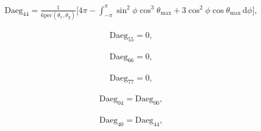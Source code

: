 \documentclass[a4paper,11pt,twoside,openright]{book}
\providecommand{\pec}{{\mathrm{pec}}}%
\def\lthtmlcheckvsize{\ifdim\ht\sizebox<\vsize 
  \ifdim\wd\sizebox<\hsize\expandafter\hfill\fi \expandafter\vfill
  \else\expandafter\vss\fi}%
\begin{document}
{\newpage\clearpage
\setcounter{equation}{63}
%
\begin{subequations}\begin{flalign}
&\textrm{Daeg}_{44} = \frac{1}{6\pec (\theta_x , \theta_y )} \Bigg[
4\pi -
\int_{-\pi}^{\pi}
\sin^2\phi \cos^3\theta_{\textrm{max}}+ 3\cos^2\phi \cos\theta_{\textrm{max}}
\,\mathrm{d}\phi
\Bigg] , &
\end{flalign}\end{subequations}%
\lthtmldisplayZ
\lthtmlcheckvsize\clearpage}

{\newpage\clearpage
\setcounter{equation}{63}
%
\begin{subequations}\begin{flalign}
&\textrm{Daeg}_{55} = 0 , &
\end{flalign}\end{subequations}%
\lthtmldisplayZ
\lthtmlcheckvsize\clearpage}

{\newpage\clearpage
\setcounter{equation}{63}
%
\begin{subequations}\begin{flalign}
&\textrm{Daeg}_{66} = 0 , &
\end{flalign}\end{subequations}%
\lthtmldisplayZ
\lthtmlcheckvsize\clearpage}

{\newpage\clearpage
\setcounter{equation}{63}
%
\begin{subequations}\begin{flalign}
&\textrm{Daeg}_{77} = 0 , &
\end{flalign}\end{subequations}%
\lthtmldisplayZ
\lthtmlcheckvsize\clearpage}

{\newpage\clearpage
\setcounter{equation}{63}
%
\begin{subequations}\begin{flalign}
&\textrm{Daeg}_{04} = \textrm{Daeg}_{00} , &
\end{flalign}\end{subequations}%
\lthtmldisplayZ
\lthtmlcheckvsize\clearpage}

{\newpage\clearpage
\setcounter{equation}{63}
%
\begin{subequations}\begin{flalign}
&\textrm{Daeg}_{40} = \textrm{Daeg}_{44} , &
\end{flalign}\end{subequations}%
\lthtmldisplayZ
\lthtmlcheckvsize\clearpage}
\end{document}
